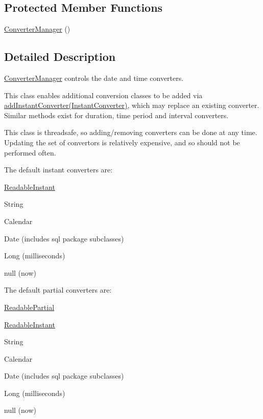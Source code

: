 \subsection*{Protected Member Functions}
\begin{DoxyCompactItemize}
\item 
\hyperlink{classorg_1_1joda_1_1time_1_1convert_1_1_converter_manager_a7b95432f90ed6959fef1a6d7a64bf8be}{Converter\-Manager} ()
\end{DoxyCompactItemize}


\subsection{Detailed Description}
\hyperlink{classorg_1_1joda_1_1time_1_1convert_1_1_converter_manager}{Converter\-Manager} controls the date and time converters. 

This class enables additional conversion classes to be added via \hyperlink{classorg_1_1joda_1_1time_1_1convert_1_1_converter_manager_a70505c21c83894de02f210c81f2fada3}{add\-Instant\-Converter(\-Instant\-Converter)}, which may replace an existing converter. Similar methods exist for duration, time period and interval converters. 

This class is threadsafe, so adding/removing converters can be done at any time. Updating the set of convertors is relatively expensive, and so should not be performed often. 

The default instant converters are\-: 
\begin{DoxyItemize}
\item \hyperlink{interfaceorg_1_1joda_1_1time_1_1_readable_instant}{Readable\-Instant} 
\item String 
\item Calendar 
\item Date (includes sql package subclasses) 
\item Long (milliseconds) 
\item null (now) 
\end{DoxyItemize}

The default partial converters are\-: 
\begin{DoxyItemize}
\item \hyperlink{interfaceorg_1_1joda_1_1time_1_1_readable_partial}{Readable\-Partial} 
\item \hyperlink{interfaceorg_1_1joda_1_1time_1_1_readable_instant}{Readable\-Instant} 
\item String 
\item Calendar 
\item Date (includes sql package subclasses) 
\item Long (milliseconds) 
\item null (now) 
\end{DoxyItemize}

